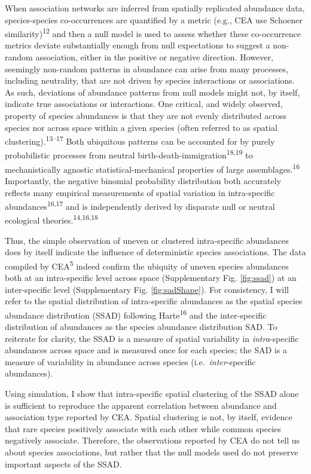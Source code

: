 \documentclass[
]{article}
\begin{document}
When association networks are inferred from spatially replicated
abundance data, species-species co-occurrences are quantified by a
metric (e.g., CEA use Schoener similarity)\textsuperscript{12} and then
a null model is used to assess whether these co-occurrence metrics
deviate substantially enough from null expectations to suggest a
non-random association, either in the positive or negative direction.
However, seemingly non-random patterns in abundance can arise from many
processes, including neutrality, that are not driven by species
interactions or associations. As such, deviations of abundance patterns
from null models might not, by itself, indicate true associations or
interactions. One critical, and widely observed, property of species
abundances is that they are not evenly distributed across species nor
across space within a given species (often referred to as spatial
clustering).\textsuperscript{13--17} Both ubiquitous patterns can be
accounted for by purely probabilistic processes from neutral
birth-death-immigration\textsuperscript{18,19} to mechanistically
agnostic statistical-mechanical properties of large
assemblages.\textsuperscript{16} Importantly, the negative binomial
probability distribution both accurately reflects many empirical
measurements of spatial variation in intra-specific
abundances\textsuperscript{16,17} and is independently derived by
disparate null or neutral ecological theories.\textsuperscript{14,16,18}

Thus, the simple observation of uneven or clustered intra-specific
abundances does by itself indicate the influence of deterministic
species associations. The data compiled by CEA\textsuperscript{5} indeed
confirm the ubiquity of uneven species abundances both at an
intra-specific level across space (Supplementary Fig. \ref{fig:ssad}) at
an inter-specific level (Supplementary Fig. \ref{fig:sadShape}). For
consistency, I will refer to the spatial distribution of intra-specific
abundances as the spatial species abundance distribution (SSAD)
following Harte\textsuperscript{16} and the inter-specific distribution
of abundances as the species abundance distribution SAD. To reiterate
for clarity, the SSAD is a measure of spatial variability in
\emph{intra}-specific abundances across space and is measured once for
each species; the SAD is a measure of variability in abundance across
species (i.e.~\emph{inter}-specific abundances).

Using simulation, I show that intra-specific spatial clustering of the
SSAD alone is sufficient to reproduce the apparent correlation between
abundance and association type reported by CEA. Spatial clustering is
not, by itself, evidence that rare species positively associate with
each other while common species negatively associate. Therefore, the
observations reported by CEA do not tell us about species associations,
but rather that the null models used do not preserve important aspects
of the SSAD.
\end{document}
